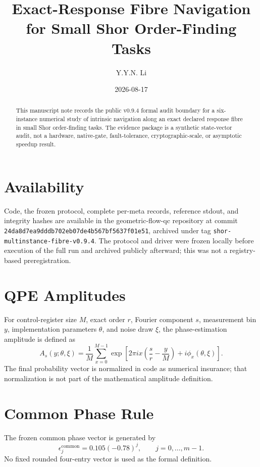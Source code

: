 \documentclass[11pt]{article}
\title{Exact-Response Fibre Navigation for Small Shor Order-Finding Tasks}
\author{Y.Y.N. Li}
\date{2026-08-17}
\begin{document}
\maketitle

\begin{abstract}
This manuscript note records the public v0.9.4 formal audit boundary for a
six-instance numerical study of intrinsic navigation along an exact declared
response fibre in small Shor order-finding tasks. The evidence package is a
synthetic state-vector audit, not a hardware, native-gate, fault-tolerance,
cryptographic-scale, or asymptotic speedup result.
\end{abstract}

\section{Availability}

Code, the frozen protocol, complete per-meta records, reference stdout, and
integrity hashes are available in the geometric-flow-qc repository at commit
\texttt{24da8d7ea9dddb702eb07de4b567bf5637f01e51}, archived under tag
\texttt{shor-multinstance-fibre-v0.9.4}. The protocol and driver were frozen
locally before execution of the full run and archived publicly afterward; this
was not a registry-based preregistration.

\section{QPE Amplitudes}

For control-register size \(M\), exact order \(r\), Fourier component \(s\),
measurement bin \(y\), implementation parameters \(\theta\), and noise draw
\(\xi\), the phase-estimation amplitude is defined as
\[
A_s(y;\theta,\xi)=
\frac{1}{M}\sum_{x=0}^{M-1}
\exp\left[
2\pi i x\left(\frac{s}{r}-\frac{y}{M}\right)
+ i\phi_x(\theta,\xi)
\right].
\]
The final probability vector is normalized in code as numerical insurance;
that normalization is not part of the mathematical amplitude definition.

\section{Common Phase Rule}

The frozen common phase vector is generated by
\[
\epsilon^{\mathrm{common}}_j = 0.105(-0.78)^j,
\qquad j=0,\ldots,m-1.
\]
No fixed rounded four-entry vector is used as the formal definition.
\end{document}

